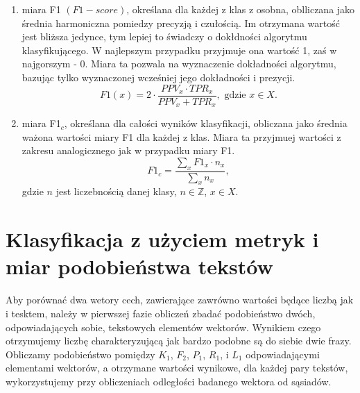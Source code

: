 \documentclass{classrep}
\begin{document}
\begin{enumerate}
\item miara F1 \((F1-score)\), określana dla każdej z klas z osobna, oblliczana jako średnia harmoniczna pomiedzy precyzją i czułością.
Im otrzymana wartość jest bliższa jedynce, tym lepiej to świadczy o dokłdności algorytmu klasyfikującego. W najlepszym przypadku przyjmuje ona wartość 1, zaś w najgorszym - 0.
Miara ta pozwala na wyznaczenie dokładności algorytmu, bazując tylko wyznaczonej wcześniej jego dokładności i prezycji.
  \begin{equation}
    F1(x) = 2 \cdot \frac{PPV_{x} \cdot TPR_{x}} {PPV_{x} + TPR_{x}}, \text{ gdzie } x\in X.
  \end{equation}

\item miara F1$_c$, określana dla całości wyników klasyfikacji, obliczana jako średnia ważona wartości miary F1 dla każdej z klas. Miara ta przyjmuej wartości z zakresu analogicznego jak w przypadku miary F1.
\begin{equation}
  F1_c = \frac{\sum_{x} F1_x \cdot n_{x}}{\sum_{x} n_{x}}, 
\end{equation}
  gdzie $n$ jest liczebnością danej klasy, $n\in \mathbb{Z}$, $x\in X$.
\end{enumerate}



\section{Klasyfikacja z użyciem metryk i miar podobieństwa tekstów}

Aby porównać dwa wetory cech, zawierające zawrówno wartości będące liczbą jak i tesktem, należy w pierwszej fazie obliczeń zbadać podobieństwo dwóch, odpowiadających sobie,
tekstowych elementów wektorów. Wynikiem czego otrzymujemy liczbę charakteryzującą jak bardzo podobne są do siebie dwie frazy. 
Obliczamy
podobieństwo pomiędzy $K_1$, $F_2$, $P_1$, $R_1$, i $L_1$ odpowiadającymi elementami wektorów, a otrzymane wartości wynikowe, dla każdej pary tekstów, wykorzystujemy 
przy obliczeniach odległości badanego wektora od sąsiadów. %
\end{document}
